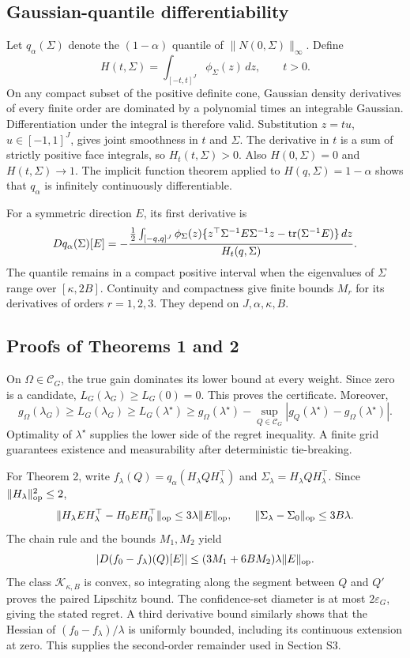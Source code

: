 \subsection{Gaussian-quantile differentiability}
Let $q_\alpha(\Sigma)$ denote the $(1-\alpha)$ quantile of $\|N(0,\Sigma)\|_\infty$. Define
\[
 H(t,\Sigma)=\int_{[-t,t]^J}\phi_\Sigma(z)\,dz,\qquad t>0.
\]
On any compact subset of the positive definite cone, Gaussian density derivatives of every finite order are dominated by a polynomial times an integrable Gaussian. Differentiation under the integral is therefore valid. Substitution $z=tu$, $u\in[-1,1]^J$, gives joint smoothness in $t$ and $\Sigma$. The derivative in $t$ is a sum of strictly positive face integrals, so $H_t(t,\Sigma)>0$. Also $H(0,\Sigma)=0$ and $H(t,\Sigma)\to1$. The implicit function theorem applied to $H(q,\Sigma)=1-\alpha$ shows that $q_\alpha$ is infinitely continuously differentiable.

For a symmetric direction $E$, its first derivative is
\begin{equation}\label{eq:gradientq}
 Dq_\alpha(\Sigma)[E]=-
 \frac{\frac12\int_{[-q,q]^J}\phi_\Sigma(z)
 \{z^\top\Sigma^{-1}E\Sigma^{-1}z-\operatorname{tr}(\Sigma^{-1}E)\}\,dz}
 {H_t(q,\Sigma)}.
\end{equation}
The quantile remains in a compact positive interval when the eigenvalues of $\Sigma$ range over $[\kappa,2B]$. Continuity and compactness give finite bounds $M_r$ for its derivatives of orders $r=1,2,3$. They depend on $J,\alpha,\kappa,B$.

\subsection{Proofs of Theorems 1 and 2}
On $\Omega\in\mathcal C_G$, the true gain dominates its lower bound at every weight. Since zero is a candidate, $L_G(\lambda_G)\geq L_G(0)=0$. This proves the certificate. Moreover,
\[
 g_\Omega(\lambda_G)\geq L_G(\lambda_G)
 \geq L_G(\lambda^\star)
 \geq g_\Omega(\lambda^\star)-\sup_{Q\in\mathcal C_G}|g_Q(\lambda^\star)-g_\Omega(\lambda^\star)|.
\]
Optimality of $\lambda^\star$ supplies the lower side of the regret inequality. A finite grid guarantees existence and measurability after deterministic tie-breaking.

For Theorem 2, write $f_\lambda(Q)=q_\alpha(H_\lambda QH_\lambda^\top)$ and $\Sigma_\lambda=H_\lambda QH_\lambda^\top$. Since $\|H_\lambda\|_{\mathrm{op}}^2\leq2$,
\[
 \|H_\lambda EH_\lambda^\top-H_0EH_0^\top\|_{\mathrm{op}}\leq3\lambda\|E\|_{\mathrm{op}},
 \qquad \|\Sigma_\lambda-\Sigma_0\|_{\mathrm{op}}\leq3B\lambda.
\]
The chain rule and the bounds $M_1,M_2$ yield
\[
 |D(f_0-f_\lambda)(Q)[E]|
 \leq(3M_1+6BM_2)\lambda\|E\|_{\mathrm{op}}.
\]
The class $\mathcal K_{\kappa,B}$ is convex, so integrating along the segment between $Q$ and $Q'$ proves the paired Lipschitz bound. The confidence-set diameter is at most $2\varepsilon_G$, giving the stated regret. A third derivative bound similarly shows that the Hessian of $(f_0-f_\lambda)/\lambda$ is uniformly bounded, including its continuous extension at zero. This supplies the second-order remainder used in Section S3.

